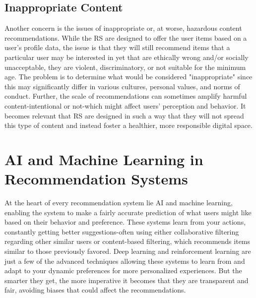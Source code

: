\documentclass{article}
\begin{document}
\subsection{Inappropriate Content}
Another concern is the issues of inappropriate or, at worse, hazardous content recommendations. While the RS are designed to offer the user items based on a user's profile data, the issue is that they will still recommend items that a particular user may be interested in yet that are ethically wrong and/or socially unacceptable, they are violent, discriminatory, or not suitable for the minimum age.\cite{IaAEC_in_RS} The problem is to determine what would be considered "inappropriate" since this may significantly differ in various cultures, personal values, and norms of conduct. Further, the scale of recommendations can sometimes amplify harmful content-intentional or not-which might affect users' perception and behavior. It becomes relevant that RS are designed in such a way that they will not spread this type of content and instead foster a healthier, more responsible digital space.\cite{IaAEC_in_RS}

\section{AI and Machine Learning in Recommendation Systems}
At the heart of every recommendation system lie AI and machine learning, enabling the system to make a fairly accurate prediction of what users might like based on their behavior and preference.\cite{AI_in_RS}\cite{7956539} These systems learn from your actions, constantly getting better suggestions-often using either collaborative filtering regarding other similar users or content-based filtering, which recommends items similar to those previously favored.\cite{AI_IRS}
Deep learning and reinforcement learning are just a few of the advanced techniques allowing these systems to learn from and adapt to your dynamic preferences for more personalized experiences. But the smarter they get, the more imperative it becomes that they are transparent and fair, avoiding biases that could affect the recommendations.\cite{AI_in_RS}

\clearpage
\end{document}

